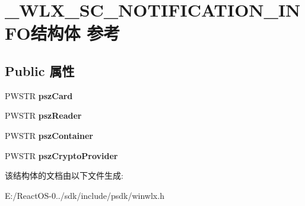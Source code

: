 \hypertarget{struct___w_l_x___s_c___n_o_t_i_f_i_c_a_t_i_o_n___i_n_f_o}{}\section{\+\_\+\+W\+L\+X\+\_\+\+S\+C\+\_\+\+N\+O\+T\+I\+F\+I\+C\+A\+T\+I\+O\+N\+\_\+\+I\+N\+F\+O结构体 参考}
\label{struct___w_l_x___s_c___n_o_t_i_f_i_c_a_t_i_o_n___i_n_f_o}
\subsection*{Public 属性}
\begin{DoxyCompactItemize}
\item 
\mbox{\label{struct___w_l_x___s_c___n_o_t_i_f_i_c_a_t_i_o_n___i_n_f_o_a8793545f10d82ebbdd8a44b236012518}} 
P\+W\+S\+TR {\bfseries psz\+Card}
\item 
\mbox{\label{struct___w_l_x___s_c___n_o_t_i_f_i_c_a_t_i_o_n___i_n_f_o_af7d89e6fbba77750dab995ee2f30440f}} 
P\+W\+S\+TR {\bfseries psz\+Reader}
\item 
\mbox{\label{struct___w_l_x___s_c___n_o_t_i_f_i_c_a_t_i_o_n___i_n_f_o_aa93d8b0b2466941a220786709c27f6a0}} 
P\+W\+S\+TR {\bfseries psz\+Container}
\item 
\mbox{\label{struct___w_l_x___s_c___n_o_t_i_f_i_c_a_t_i_o_n___i_n_f_o_a6d7c596427228e1ceac6ee8273cabead}} 
P\+W\+S\+TR {\bfseries psz\+Crypto\+Provider}
\end{DoxyCompactItemize}


该结构体的文档由以下文件生成\+:\begin{DoxyCompactItemize}
\item 
E\+:/\+React\+O\+S-\/0../sdk/include/psdk/winwlx.\+h\end{DoxyCompactItemize}
